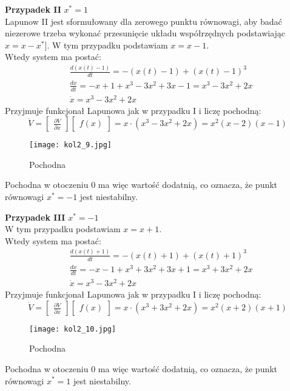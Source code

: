 \documentclass[a4paper,11pt]{article}
\begin{document}
\textbf{Przypadek II} \( x^{*} = 1 \) \\
Lapunow II jest sformułowany dla zerowego punktu równowagi, aby badać niezerowe trzeba wykonać przesunięcie układu współrzędnych podstawiając \( x = x - x^{*} ] \). W tym przypadku podstawiam \( x = x - 1 \). \\
Wtedy system ma postać:
\begin{align*}
& \frac{d(x(t)-1)}{dt} = -( x(t) - 1 ) + ( x(t) - 1 )^{3} \\
& \frac{dx}{dt} = -x+1+x^{3}-3x^{2}+3x-1=x^{3}-3x^{2}+2x \\
& \dot{x}=x^{3}-3x^{2}+2x 
\end{align*}
Przyjmuje funkcjonał Lapunowa jak w przypadku I i liczę pochodną:  
\begin{equation*}
\dot{V} = 
\begin{bmatrix}
\frac{\partial V}{\partial x}
\end{bmatrix}
\begin{bmatrix}
f(x)
\end{bmatrix}
=
x \cdot ( x^{3}-3x^{2}+2x ) = x^{2}(x-2)(x-1)
\end{equation*}
\begin{figure}[H]
\centerline{\texttt{[image: kol2\_9.jpg]}}
\caption{Pochodna}
\label{fig:kol2_9}
\end{figure}
Pochodna w otoczeniu 0 ma więc wartość dodatnią, co oznacza, że punkt równowagi \( x^{*} = -1 \) jest niestabilny.

\textbf{Przypadek III} \( x^{*} = -1 \) \\
W tym przypadku podstawiam \( x = x + 1 \). \\
Wtedy system ma postać:
\begin{align*}
& \frac{d(x(t)+1)}{dt} = -( x(t) + 1 ) + ( x(t) + 1 )^{3} \\
& \frac{dx}{dt} = -x-1+x^{3}+3x^{2}+3x+1=x^{3}+3x^{2}+2x \\
& \dot{x}=x^{3}-3x^{2}+2x 
\end{align*}
Przyjmuje funkcjonał Lapunowa jak w przypadku I i liczę pochodną:  
\begin{equation*}
\dot{V} = 
\begin{bmatrix}
\frac{\partial V}{\partial x}
\end{bmatrix}
\begin{bmatrix}
f(x)
\end{bmatrix}
=
x \cdot ( x^{3}+3x^{2}+2x ) = x^{2}(x+2)(x+1)
\end{equation*}
\begin{figure}[H]
\centerline{\texttt{[image: kol2\_10.jpg]}}
\caption{Pochodna}
\label{fig:kol2_10}
\end{figure}
Pochodna w otoczeniu 0 ma więc wartość dodatnią, co oznacza, że punkt równowagi \( x^{*} = 1 \) jest niestabilny.
\end{document}
